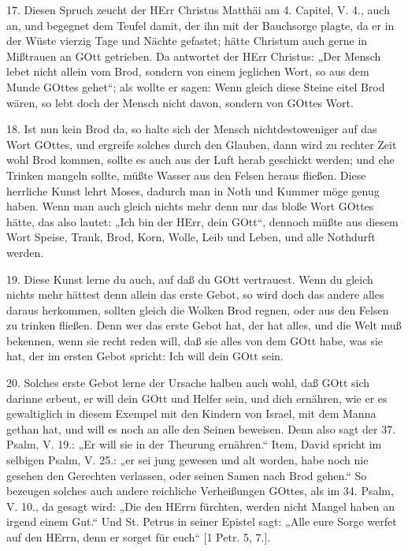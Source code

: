 17. Diesen Spruch zeucht der HErr Christus Matthäi am 4. Capitel, V. 4., auch an, und begegnet dem Teufel damit, der ihn mit der Bauchsorge plagte, da er in der Wüste vierzig Tage und Nächte gefastet; hätte Christum auch gerne in Mißtrauen an GOtt getrieben. Da antwortet der HErr Christus: „Der Mensch lebet nicht allein vom Brod, sondern von einem jeglichen Wort, so aus dem Munde GOttes gehet“; als wollte er sagen: Wenn gleich diese Steine eitel Brod wären, so lebt doch der Mensch nicht davon, sondern von GOttes Wort.

18. Ist nun kein Brod da, so halte sich der Mensch nichtdestoweniger auf das Wort GOttes, und ergreife solches durch den Glauben, dann wird zu rechter Zeit wohl Brod kommen, sollte es auch aus der Luft herab geschickt werden; und ehe Trinken mangeln sollte, müßte Wasser aus den Felsen heraus fließen. Diese herrliche Kunst lehrt Moses, dadurch man in Noth und Kummer möge genug haben. Wenn man auch gleich nichts mehr denn nur das bloße Wort GOttes hätte, das also lautet: „Ich bin der HErr, dein GOtt“, dennoch müßte aus diesem Wort Speise, Trank, Brod, Korn, Wolle, Leib und Leben, und alle Nothdurft werden.

19. Diese Kunst lerne du auch, auf daß du GOtt vertrauest. Wenn du gleich nichts mehr hättest denn allein das erste Gebot, so wird doch das andere alles daraus herkommen, sollten gleich die Wolken Brod regnen, oder aus den Felsen zu trinken fließen. Denn wer das erste Gebot hat, der hat alles, und die Welt muß bekennen, wenn sie recht reden will, daß sie alles von dem GOtt habe, was sie hat, der im ersten Gebot spricht: Ich will dein GOtt sein.

20. Solches erste Gebot lerne der Ursache halben auch wohl, daß GOtt sich darinne erbeut, er will dein GOtt und Helfer sein, und dich ernähren, wie er es gewaltiglich in diesem Exempel
mit den Kindern von Israel, mit dem Manna gethan hat, und will es noch an alle den Seinen beweisen. Denn also sagt der 37. Psalm, V. 19.: „Er will sie in der Theurung ernähren.“ Item, David spricht im selbigen Psalm, V. 25.: „er sei jung gewesen und alt worden, habe noch nie gesehen den Gerechten verlassen, oder seinen Samen nach Brod gehen.“ So bezeugen solches auch andere reichliche Verheißungen GOttes, als im 34. Psalm, V. 10., da gesagt wird: „Die den HErrn fürchten, werden nicht Mangel haben an irgend einem Gut.“ Und St. Petrus in seiner Epistel sagt: „Alle eure Sorge werfet auf den HErrn, denn er sorget für euch“ [1 Petr. 5, 7.].


